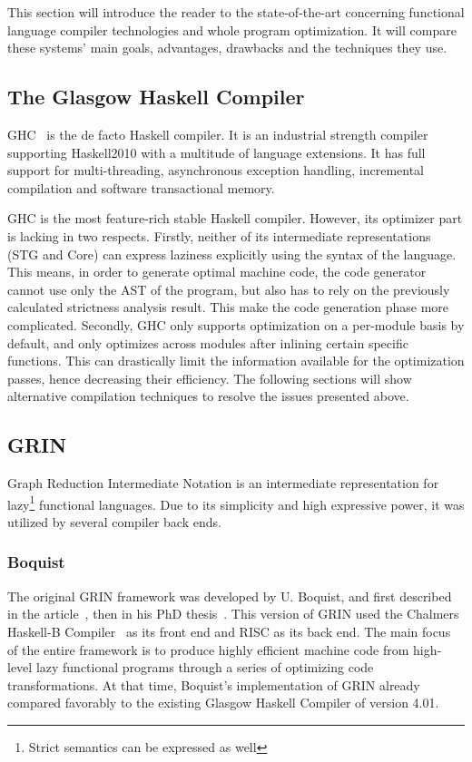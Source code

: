\documentclass[main.tex]{subfiles}
\begin{document}
	
	This section will introduce the reader to the state-of-the-art concerning functional language compiler technologies and whole program optimization. It will compare these systems' main goals, advantages, drawbacks and the techniques they use.
	
	\subsection{The Glasgow Haskell Compiler}

	GHC~\cite{ghc} is the de facto Haskell compiler. It is an industrial strength compiler supporting Haskell2010 with a multitude of language extensions. It has full support for multi-threading, asynchronous exception handling, incremental compilation and software transactional memory.
	
	GHC is the most feature-rich stable Haskell compiler. However, its optimizer part is lacking in two respects. Firstly, neither of its intermediate representations (STG and Core) can express laziness explicitly using the syntax of the language. This means, in order to generate optimal machine code, the code generator cannot use only the AST of the program, but also has to rely on the previously calculated strictness analysis result. This make the code generation phase more complicated. Secondly, GHC only supports optimization on a per-module basis by default, and only optimizes across modules after inlining certain specific functions. This can drastically limit the information available for the optimization passes, hence decreasing their efficiency. The following sections will show alternative compilation techniques to resolve the issues presented above.
	
	\subsection{GRIN}
	
	Graph Reduction Intermediate Notation is an intermediate representation for lazy\footnote{Strict semantics can be expressed as well} functional languages. Due to its simplicity and high expressive power, it was utilized by several compiler back ends.
	
	\subsubsection{Boquist}
	
	The original GRIN framework was developed by U. Boquist, and first described in the article~\cite{boquist-grin}, then in his PhD thesis~\cite{boquist-phd}. This version of GRIN used the Chalmers Haskell-B Compiler~\cite{hbc} as its front end and RISC as its back end. The main focus of the entire framework is to produce highly efficient machine code from high-level lazy functional programs through a series of optimizing code transformations. At that time, Boquist's implementation of GRIN already compared favorably to the existing Glasgow Haskell Compiler of version 4.01.
	
\end{document}

